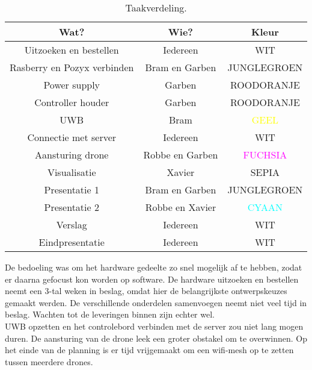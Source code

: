 \begin{table}[p]
\centering
\begin{tabular}{ |c|c|c| } \hline
Wat? & Wie? & Kleur \\ [.5ex] \hline\hline
Uitzoeken en bestellen & Iedereen & WIT \\ \hline
Rasberry en Pozyx verbinden & Bram en Garben & \textcolor{JungleGreen}{JUNGLEGROEN} \\ \hline
Power supply & Garben & \textcolor{RedOrange}{ROODORANJE} \\ \hline
Controller houder & Garben & \textcolor{RedOrange}{ROODORANJE} \\ \hline
UWB & Bram & \textcolor{Yellow}{GEEL} \\ \hline
Connectie met server & Iedereen & WIT \\ \hline
Aansturing drone & Robbe en Garben & \textcolor{Fuchsia}{FUCHSIA} \\ \hline
Visualisatie & Xavier & \textcolor{Sepia}{SEPIA} \\ \hline
Presentatie 1 & Bram en Garben & \textcolor{JungleGreen}{JUNGLEGROEN} \\ \hline
Presentatie 2 & Robbe en Xavier & \textcolor{Cyan}{CYAAN} \\ \hline
Verslag & Iedereen & WIT \\ \hline
Eindpresentatie & Iedereen & WIT \\ \hline
\end{tabular}
\caption[Taakverdeling]{Taakverdeling.}
\label{tab:taakverdeling}
\end{table}

De bedoeling was om het hardware gedeelte zo snel mogelijk af te hebben, zodat er daarna gefocust kon worden op software.
De hardware uitzoeken en bestellen neemt een 3-tal weken in beslag, omdat hier de belangrijkste ontwerpskeuzes gemaakt werden.
De verschillende onderdelen samenvoegen neemt niet veel tijd in beslag.
Wachten tot de leveringen binnen zijn echter wel.\\

UWB opzetten en het controlebord verbinden met de server zou niet lang mogen duren.
De aansturing van de drone leek een groter obstakel om te overwinnen.
Op het einde van de planning is er tijd vrijgemaakt om een wifi-mesh op te zetten tussen meerdere drones.

